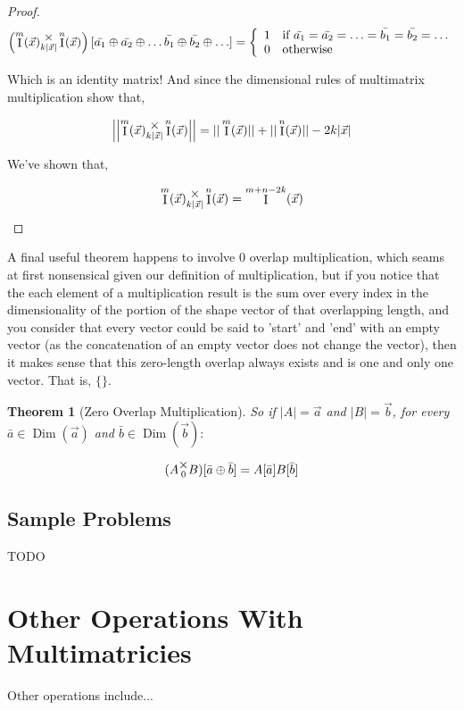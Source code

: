 \documentclass[12pt]{article}
\theoremstyle{definition}
\theoremstyle{plain}
\newtheorem{theorem}{Theorem}[section]
\theoremstyle{ppart}
\DeclareMathOperator{\Dim}{Dim}
\DeclareMathOperator{\Ident}{I}
\newcommand{\mmult}[1]{\text{\raisebox{1ex}{$\underset{#1}{\times}$}}}
\begin{document}
\begin{landscape}
\begin{proof}
\begin{align*}
\left( \Ident^m(\vec{x}) \mmult{k|\vec{x}|} \Ident^n(\vec{x}) \right)
[\bar{a_1} \oplus \bar{a_2} \oplus \ldots \bar{b_1} \oplus \bar{b_2} \oplus \ldots] =
\left\{
  \begin{array}{ll}
    1 & \mbox{if } \bar{a_1} = \bar{a_2} = \ldots = \bar{b_1} = \bar{b_2} = \ldots \\
    0 & \mbox{otherwise}
  \end{array}
\right.
\end{align*} 

Which is an identity matrix! And since the dimensional rules of multimatrix 
multiplication show that,

\[
 \left|\left| \Ident^m(\vec{x}) \mmult{k|\vec{x}|} \Ident^n(\vec{x}) \right|\right|
 =
 ||\Ident^m(\vec{x})|| + ||\Ident^n(\vec{x})|| - 2k|\vec{x}|
\]

We've shown that,

\[ \Ident^m(\vec{x}) \mmult{k|\vec{x}|} \Ident^n(\vec{x}) = \Ident^{m+n-2k}(\vec{x}) \]
\end{proof}
\end{landscape}

A final useful theorem happens to involve 0 overlap multiplication, which seams at first
nonsensical given our definition of multiplication,
but if you notice that the each element of a
multiplication result is the sum over every index in the dimensionality of the
portion of the shape vector of that overlapping length, and you consider that every
vector could be said to 'start' and 'end' with an empty vector (as the concatenation of
an empty vector does not change the vector), then it makes sense that this zero-length
overlap always exists and is one and only one vector. That is, $\{\}$.

\begin{theorem}[Zero Overlap Multiplication]
So if $|A| = \vec{a}$ and $|B| = \vec{b}$, for every $\bar{a} \in \Dim(\vec{a})$
and $\bar{b} \in \Dim(\vec{b}):$

\[ (A \mmult{0} B)[\bar{a} \oplus \bar{b}] = A[\bar{a}] B[\bar{b}] \]
\end{theorem}

\subsection*{Sample Problems}
TODO

\section{Other Operations With Multimatricies}
Other operations include...
\end{document}
